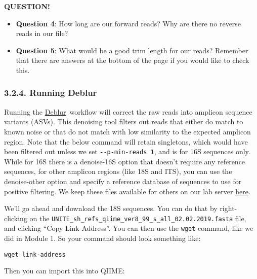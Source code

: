 \documentclass[
]{book}
\providecommand{\tightlist}{%
  \setlength{\itemsep}{0pt}\setlength{\parskip}{0pt}}
\newenvironment{bluebox}{
  \definecolor{shadecolor}{RGB}{172, 210, 237}
  \color{white}
  \begin{shaded}}
 {\end{shaded}}
\begin{document}
\begin{bluebox}

\begin{center}
\textbf{QUESTION!}

\end{center}

\begin{itemize}
\tightlist
\item
  \textbf{Question 4}: How long are our forward reads? Why are there no reverse reads in our file?
\item
  \textbf{Question 5}: What would be a good trim length for our reads? Remember that there are answers at the bottom of the page if you would like to check this.
\end{itemize}

\end{bluebox}

\subsubsection{3.2.4. Running Deblur}\label{running-deblur-2}

Running the \href{https://github.com/biocore/deblur}{Deblur}~workflow will correct the raw reads into amplicon sequence variants (ASVs). This denoising tool filters out reads that either do match to known noise or that do not match with low similarity to the expected amplicon region. Note that the below command will retain singletons, which would have been filtered out unless we set \texttt{-\/-p-min-reads\ 1}, and is for 16S sequences only. While for 16S there is a denoise-16S option that doesn't require any reference sequences, for other amplicon regions (like 18S and ITS), you can use the denoise-other option and specify a reference database of sequences to use for positive filtering. We keep these files available for others on our lab server \href{http://kronos.pharmacology.dal.ca/public_files/MH/deblur_non16S_ref/}{here}.

We'll go ahead and download the 18S sequences. You can do that by right-clicking on the \texttt{UNITE\_sh\_refs\_qiime\_ver8\_99\_s\_all\_02.02.2019.fasta} file, and clicking ``Copy Link Address''. You can then use the \texttt{wget} command, like we did in Module 1. So your command should look something like:

\begin{verbatim}
wget link-address
\end{verbatim}

Then you can import this into QIIME:
\end{document}

